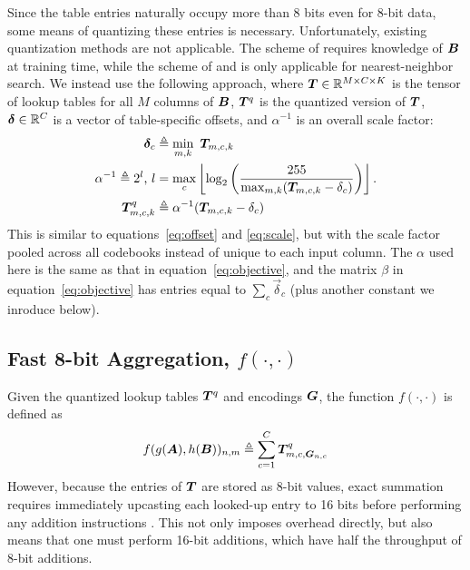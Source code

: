 Since the table entries naturally occupy more than 8 bits even for 8-bit data, some means of quantizing these entries is necessary. Unfortunately, existing quantization methods are not applicable. The scheme of \citet{bolt} requires knowledge of $\bm{B}$ at training time, while the scheme of \citet{quickAdc} and \citet{quickerAdc} is only applicable for nearest-neighbor search. We instead use the following approach, where $\bm{T} \in \mathbb{R}^{M \times C \times K}$ is the tensor of lookup tables for all $M$ columns of $\bm{B}$, $\bm{T}^{q}$ is the quantized version of $\bm{T}$, $\bm{\delta} \in \mathbb{R}^C$ is a vector of table-specific offsets, and $\alpha^{-1}$ is an overall scale factor:
\begin{align}
    \bm{\delta}_c &\triangleq \min_{m,k} \text{ } \bm{T}_{m,c,k} \\
    \alpha^{-1} \triangleq 2^l \text{, } l &= \max_c \left \lfloor  \log_2 \left( \frac{255}{
            \max_{m,k} (\bm{T}_{m,c,k} - \delta_{c})
        } \right) \right \rfloor. \\
    \bm{T}^{q}_{m,c,k} &\triangleq \alpha^{-1}(\bm{T}_{m,c,k} - \delta_{c})
\end{align}
This is similar to equations~\ref{eq:offset} and \ref{eq:scale}, but with the scale factor pooled across all codebooks instead of unique to each input column. The $\alpha$ used here is the same as that in equation~\ref{eq:objective}, and the matrix $\beta$ in equation~\ref{eq:objective} has entries equal to $\sum_c \vec{\delta}_c$ (plus another constant we inroduce below).

\subsection{Fast 8-bit Aggregation, $f(\cdot,\cdot)$} \label{sec:aggregate}

Given the quantized lookup tables $\bm{T}^{q}$ and encodings $\bm{G}$, the function $f(\cdot,\cdot)$ is defined as
\begin{align}
    f(g(\bm{A}), h(\bm{B}))_{n,m} \triangleq \sum_{c=1}^C \bm{T}^{q}_{m,c,\bm{G}_{n,c}} \\
\end{align}
However, because the entries of $\bm{T}$ are stored as 8-bit values, exact summation requires immediately upcasting each looked-up entry to 16 bits before performing any addition instructions \cite{bolt}. This not only imposes overhead directly, but also means that one must perform 16-bit additions, which have half the throughput of 8-bit additions.

